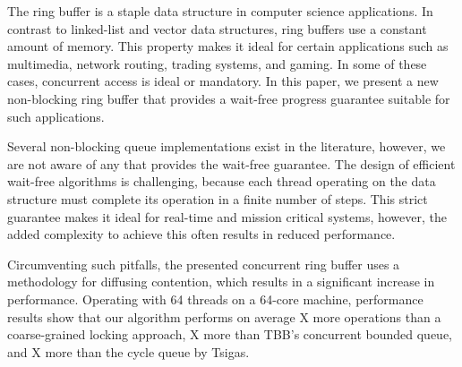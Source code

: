 
The ring buffer is a staple data structure in computer science applications.
In contrast to linked-list and vector data structures, ring buffers use a constant amount of memory.
This property makes it ideal for certain applications such as multimedia, network routing, trading systems, and gaming. 
In some of these cases, concurrent access is ideal or mandatory.
In this paper, we present a new non-blocking ring buffer that provides a wait-free progress guarantee suitable for such applications.

Several non-blocking queue implementations exist in the literature, however, we are not aware of any that provides the wait-free guarantee.
The design of efficient wait-free algorithms is challenging, because each thread operating on the data structure must complete its operation in a finite number of steps. 
This strict guarantee makes it ideal for real-time and mission critical systems, however, the added complexity to achieve this often results in reduced performance.  %

Circumventing such pitfalls, the presented concurrent ring buffer uses a methodology for diffusing contention, which results in a significant increase in performance.
Operating with 64 threads on a 64-core machine, performance results show that our algorithm performs on average X more operations than a coarse-grained locking approach, X more than TBB's concurrent bounded queue, and X more than the cycle queue by Tsigas.